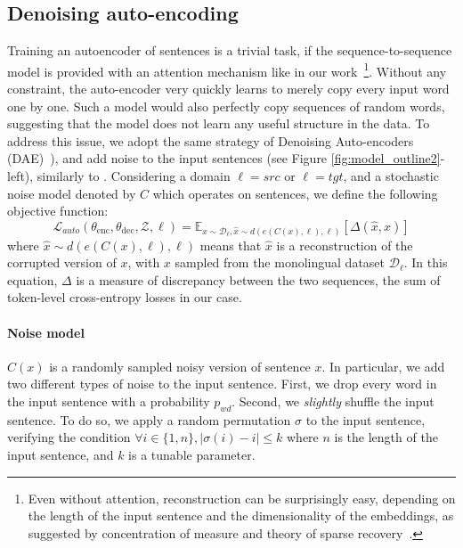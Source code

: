\subsection{Denoising auto-encoding} \label{sec:ae} Training an autoencoder of sentences is a trivial task, if the sequence-to-sequence model is provided with an attention mechanism like in our work~\footnote{Even without attention, reconstruction can be surprisingly easy, depending on the length of the input sentence and the dimensionality of the embeddings, as suggested by concentration of measure and theory of sparse recovery~\citep{compressedsensing}.}. Without any constraint,  the auto-encoder very quickly learns to merely copy every input word one by one. Such a model would also perfectly copy sequences of random words, suggesting that the model does not learn any useful structure in the data.  To address this issue, we adopt the same strategy of Denoising Auto-encoders (DAE)~\citep{vincent2008extracting}), and add noise to the input sentences (see Figure \ref{fig:model_outline2}-left), similarly to \cite{hill2016learning}. Considering a domain $\ell=src$ or $\ell=tgt$, and a stochastic noise model denoted by $C$ which operates on sentences, we define the following objective function:
\begin{equation}
    \mathcal{L}_{auto}(\theta_\mathrm{enc},\theta_\mathrm{dec},\mathcal{Z},\ell) = \mathbb{E}_{x \sim \mathcal{D}_\ell,\hat{x} \sim d(e(C(x),\ell),\ell)} \left[\Delta(\hat{x},x) \right]
\end{equation}
where $\hat{x} \sim d(e(C(x),\ell),\ell)$ means that $\hat{x}$ is a reconstruction of the corrupted version of $x$, with $x$ sampled from the monolingual dataset $\mathcal{D}_\ell$.  In this equation, $\Delta$ is a
measure of discrepancy between the two sequences, the sum of token-level cross-entropy losses in our case.

\paragraph{Noise model} $C(x)$ is a randomly sampled noisy version of sentence $x$. In particular, we add two different types of noise to the input sentence. First, we drop every word in the input sentence with a probability $p_{wd}$. Second, we \textit{slightly} shuffle the input sentence. To do so, we apply a random permutation $\sigma$ to the input sentence, verifying the condition $\forall i \in \{1, n\}, | \sigma (i) - i | \leq k$ where $n$ is the length of the input sentence, and $k$ is a tunable parameter. 

